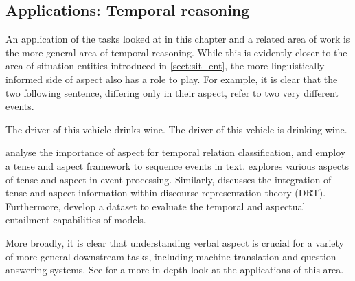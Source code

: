 \subsection*{Applications: Temporal reasoning}
An application of the tasks looked at in this chapter and a related area of work is the more general area of temporal reasoning. While this is evidently closer to the area of situation entities introduced in \ref{sect:sit_ent}, the more linguistically-informed side of aspect also has a role to play. For example, it is clear that the two following sentence, differing only in their aspect, refer to two very different events.

\begin{exe}
    \ex The driver of this vehicle drinks wine.
    \ex The driver of this vehicle is drinking wine.
\end{exe}

\citet{costa-branco-2012-aspectual} analyse the importance of aspect for temporal relation classification, and \citet{Derczynski2015TemporalRC} employ a tense and aspect framework to sequence events in text. \citet{Allen2012InterpretingTT} explores various aspects of tense and aspect in event processing. Similarly, \citet{Kamp1993} discusses the integration of tense and aspect information within discourse representation theory (DRT). Furthermore, \citet{kober-etal-2019-temporal} develop a dataset to evaluate the temporal and aspectual entailment capabilities of models. 

More broadly, it is clear that understanding verbal aspect is crucial for a variety of more general downstream tasks, including machine translation and question answering systems. See \citet{friedrich-etal-2023-kind} for a more in-depth look at the applications of this area.